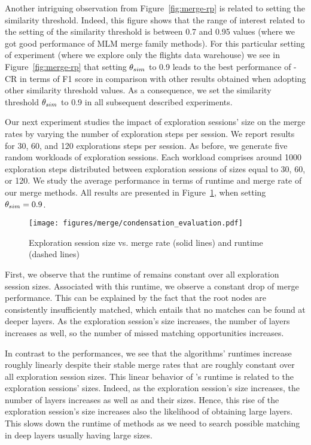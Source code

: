 Another intriguing observation from Figure~\ref{fig:merge-rp} is related to setting the similarity threshold.
Indeed, this figure shows that the range of interest related to the setting of the similarity threshold is between 0.7 and 0.95 values (where we got good performance of MLM merge family methods).
For this particular setting of experiment (where we explore only the flights data warehouse) we see in Figure~\ref{fig:merge-rp} that setting $\theta_{sim}$ to 0.9 leads to the best performance of  \mlm{}-CR  in terms of F1 score in comparison with other results obtained when adopting other similarity threshold values.
As a consequence, we set the similarity threshold  $\theta_{sim}$ to 0.9 in all subsequent described experiments. 


Our next experiment studies the impact of exploration sessions' size on the merge rates by varying the number of exploration steps per session. We report results for 30, 60, and 120 explorations steps per session. As before, we generate five random workloads of exploration sessions.
Each workload comprises around 1000 exploration steps distributed between exploration sessions of sizes equal to 30, 60, or 120. We study the average performance in terms of runtime and merge rate of our merge methods.
All results are presented in Figure~\ref{fig:condensate}, when setting $\theta_{sim} = 0.9$. 


\begin{figure}[t]
\centering
\texttt{[image: figures/merge/condensation\_evaluation.pdf]}
\caption{Exploration session size vs. merge rate (solid lines) and runtime (dashed lines)}
\label{fig:condensate}
\end{figure}


First, we observe that the runtime of \rlm{} remains constant over all exploration session sizes.
Associated with this runtime, we observe a constant drop of \rlm{} merge performance. This can be explained by the fact that the root nodes are consistently insufficiently matched, which entails that no matches can be found at deeper layers. As the exploration session's size increases, the number of layers increases as well, so the number of missed matching opportunities increases. 

In contrast to the \rlm{} performances, we see that the \mlm{} algorithms' runtimes increase roughly linearly despite their stable merge rates that are roughly constant over all exploration session sizes.
This linear behavior of \mlm{} 's runtime is related to the exploration sessions' sizes. 
Indeed, as the exploration session's size increases, the number of layers increases as well as and their sizes. Hence, this rise of the exploration session's size increases also the likelihood of obtaining large layers. This slows down the runtime of \mlm{} methods as we need to search possible matching in deep layers usually having large sizes.

